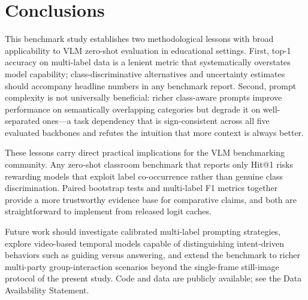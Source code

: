 \documentclass[electronics,article,submit,pdftex,moreauthors]{Definitions/mdpi}
\begin{document}
\section{Conclusions}
\label{sec:conclusion}

This benchmark study establishes two methodological lessons with broad applicability to VLM zero-shot evaluation in educational settings. First, top-1 accuracy on multi-label data is a lenient metric that systematically overstates model capability; class-discriminative alternatives and uncertainty estimates should accompany headline numbers in any benchmark report. Second, prompt complexity is not universally beneficial: richer class-aware prompts improve performance on semantically overlapping categories but degrade it on well-separated ones---a task dependency that is sign-consistent across all five evaluated backbones and refutes the intuition that more context is always better.

These lessons carry direct practical implications for the VLM benchmarking community. Any zero-shot classroom benchmark that reports only Hit@1 risks rewarding models that exploit label co-occurrence rather than genuine class discrimination. Paired bootstrap tests and multi-label F1 metrics together provide a more trustworthy evidence base for comparative claims, and both are straightforward to implement from released logit caches.

Future work should investigate calibrated multi-label prompting strategies, explore video-based temporal models capable of distinguishing intent-driven behaviors such as guiding versus answering, and extend the benchmark to richer multi-party group-interaction scenarios beyond the single-frame still-image protocol of the present study. Code and data are publicly available; see the Data Availability Statement.


\vspace{6pt}

\end{document}
